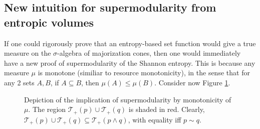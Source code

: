 \subsection{New intuition for supermodularity from entropic volumes} \label{sec:supermodularity_intuition}

If one could rigorously prove that an entropy-based set function would give a true measure on the $\sigma$-algebra of majorization cones, then one would immediately have a new proof of supermodularity of the Shannon entropy. This is because any measure $\mu$ is monotone (similiar to resource monotonicity), in the sense that for any 2 sets $A, B$, if $A \subseteq B$, then $\mu(A) \leq \mu(B)$. Consider now Figure \ref{fig:volumic_supermodularity}.

\begin{figure}[h!]
    \centering
        \caption{Depiction of the implication of supermodularity by monotonicity of $\mu$. The region $\mathcal{T}_+(p) \cup \mathcal{T}_+(q)$ is shaded in red. Clearly, $\mathcal{T}_+(p) \cup \mathcal{T}_+(q) \subseteq \mathcal{T}_+(p \wedge q)$, with equality iff $p \sim q$.}
        \label{fig:volumic_supermodularity}
\end{figure}

